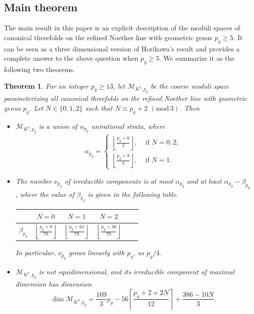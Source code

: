 \documentclass[a4paper,11pt]{amsart}
\newcommand{\M}{\ensuremath{\mathcal{M}}}
\newtheorem{thm}{Theorem}[section]
\theoremstyle{definition}
\theoremstyle{remark}
\numberwithin{equation}{section}
\begin{document}
\subsection{Main theorem}

The main result in this paper is an explicit description of the moduli spaces of canonical threefolds on the refined Noether line with geometric genus $p_g \ge 5$. %
It can be seen as a three dimensional version of Horikawa's result \cite{Horikawa1} and provides a complete answer to the above question when $p_g \ge 5$. We summarize it as the following two theorems.

\begin{thm} \label{thm: main1}
	For an integer $p_g \ge 13$, let $\M_{K^3,p_g}$ be the coarse moduli space parameterizing all canonical threefolds on the refined Noether line with geometric genus $p_g$. Let $N \in \{0, 1, 2\}$ such that $N \equiv p_g + 2$ $(\mathrm{mod} \, 3)$. Then 
	\begin{itemize}
		\item [(1)] $\M_{K^3,p_g}$ is a union of $\alpha_{p_g}$ unirational strata, where
        $$
        \alpha_{p_g} = 
        \begin{cases}
            \left\lfloor \frac{p_g+6}{4} \right\rfloor, & \text{ if } N = 0, 2;\\[5pt]
            \left\lfloor \frac{p_g + 8}{4} \right\rfloor, & \text{ if } N = 1.
        \end{cases}
        $$
		
		\item [(2)] The number $\nu_{p_g}$ of irreducible components is at most $\alpha_{p_g}$ and at least $\alpha_{p_g} - \beta_{p_g}$, where the value of $\beta_{p_g}$ is given in the following table.
        \begin{table}[htbp]
            \centering
            \renewcommand{\arraystretch}{1.4}
            \begin{tabular}{cccccc}
            & $N = 0$ & $N = 1$%
            & $N = 2$%
            \\
            \hline
            $\beta_{p_g}$ & $\left\lfloor \frac{p_g + 8}{78} \right\rfloor$ & $\left\lfloor \frac{p_g + 61}{78} \right\rfloor$ & $\left\lfloor \frac{p_g + 36}{78} \right\rfloor$
            \end{tabular}
        \end{table}
        \noindent In particular, $\nu_{p_g}$ grows linearly with $p_g$, as $p_g/4$.
		
		\item [(3)] $\M_{K^3, p_g}$ is not equidimensional, and its irreducible component of maximal dimension has dimension
		$$
		\dim \M_{K^3, p_g} = \frac{169}{3}p_g - 56 \left \lceil \frac{p_g + 2 + 2N}{12} \right \rceil + \frac{386 - 10N}{3}.
		$$
	\end{itemize}
\end{thm}
\end{document}

